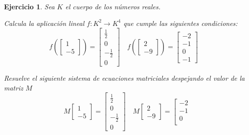 \documentclass[12pt]{amsart}
\newtheorem{ejer}{Ejercicio}
\begin{document}
\begin{ejer} Sea $K$ el cuerpo de los n\'umeros reales.
\newline
\noindent\begin{minipage}{\textwidth}
\begin{tcolorbox}[colback = green!20!white,title=Versión Aplicación]
Calcula la aplicaci\'on lineal $f:K^{2} \to K^{4}$ que cumple las siguientes condiciones: 
\[f\left(\left[\begin{array}{r}
1 \\
-5
\end{array}\right]\right) = \left[\begin{array}{r}
\frac{1}{2} \\
0 \\
-\frac{1}{2} \\
0
\end{array}\right] \quad f\left(\left[\begin{array}{r}
2 \\
-9
\end{array}\right]\right) = \left[\begin{array}{r}
-2 \\
-1 \\
0 \\
-1
\end{array}\right] \quad 
\]\end{tcolorbox}
\end{minipage} \newline
\noindent\begin{minipage}{\textwidth}
\begin{tcolorbox}[colback = blue!20!white,title=Versión Sistema Matricial]
Resuelve el siguiente sistema de ecuaciones matriciales despejando el valor de la matriz $M$
\[M \left[\begin{array}{r}
1 \\
-5
\end{array}\right] = \left[\begin{array}{r}
\frac{1}{2} \\
0 \\
-\frac{1}{2} \\
0
\end{array}\right] \quad M \left[\begin{array}{r}
2 \\
-9
\end{array}\right] = \left[\begin{array}{r}
-2 \\
-1 \\
0 \\

\end{array}\]
\end{tcolorbox}
\end{minipage}
\end{ejer}
\end{document}
